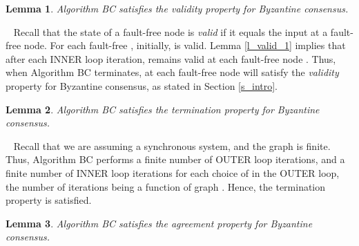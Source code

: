 \documentclass[letterpaper, 11pt]{article}
\newenvironment{proof}{\noindent {\bf Proof:}~}{\hspace*{\fill}}
\newtheorem{lemma}{Lemma}
\begin{document}
\begin{lemma}
\label{l_validity}
Algorithm BC satisfies the validity property for Byzantine consensus.
\end{lemma}
\begin{proof}
Recall that the state  of a fault-free node  is {\em valid} if it equals the input
at a fault-free node.
For each fault-free , initially,  is valid. 
Lemma \ref{l_valid_1} implies that after each INNER loop iteration,  remains valid
at each fault-free node .
Thus, when Algorithm BC terminates,  at each
fault-free node  will satisfy the {\em validity} property
for Byzantine consensus, as stated in Section \ref{s_intro}.
\end{proof}

\begin{lemma}
\label{l_termination}
Algorithm BC satisfies the termination property for Byzantine consensus.
\end{lemma}
\begin{proof}
Recall that we are assuming a synchronous system, and the graph 
is finite. Thus, Algorithm BC performs a finite number of OUTER loop iterations,
and a finite number of INNER loop iterations for each
choice of  in the OUTER loop,
the number of iterations being a function of graph .
Hence, the termination property is satisfied.
\end{proof}



\begin{lemma}
\label{l_agreement}
Algorithm BC satisfies the agreement property for Byzantine consensus.
\end{lemma}
\end{document}
